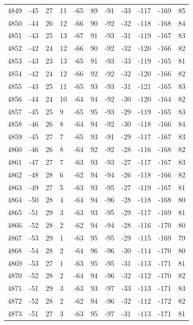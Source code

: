 \begin{table}[H]
\begin{tabular}{lllllllllll}
4849 & -45 & 27 & 11 & -65 & 89 & -91 & -33 & -117 & -169 & 85 \\
4850 & -44 & 26 & 12 & -66 & 90 & -92 & -32 & -118 & -168 & 84 \\
4851 & -43 & 25 & 13 & -67 & 91 & -93 & -31 & -119 & -167 & 83 \\
4852 & -42 & 24 & 12 & -66 & 90 & -92 & -32 & -120 & -166 & 82 \\
4853 & -43 & 23 & 13 & -65 & 91 & -93 & -33 & -119 & -165 & 81 \\
4854 & -42 & 24 & 12 & -66 & 92 & -92 & -32 & -120 & -166 & 82 \\
4855 & -43 & 25 & 11 & -65 & 93 & -93 & -31 & -121 & -165 & 83 \\
4856 & -44 & 24 & 10 & -64 & 94 & -92 & -30 & -120 & -164 & 82 \\
4857 & -45 & 25 & 9 & -65 & 95 & -93 & -29 & -119 & -165 & 83 \\
4858 & -46 & 26 & 8 & -64 & 94 & -92 & -30 & -118 & -166 & 84 \\
4859 & -45 & 27 & 7 & -65 & 93 & -91 & -29 & -117 & -167 & 83 \\
4860 & -46 & 26 & 8 & -64 & 92 & -92 & -28 & -116 & -168 & 82 \\
4861 & -47 & 27 & 7 & -63 & 93 & -93 & -27 & -117 & -167 & 83 \\
4862 & -48 & 28 & 6 & -62 & 94 & -94 & -26 & -118 & -166 & 82 \\
4863 & -49 & 27 & 5 & -63 & 93 & -95 & -27 & -119 & -167 & 81 \\
4864 & -50 & 28 & 4 & -64 & 94 & -96 & -28 & -118 & -168 & 80 \\
4865 & -51 & 29 & 3 & -63 & 93 & -95 & -29 & -117 & -169 & 81 \\
4866 & -52 & 28 & 2 & -62 & 94 & -94 & -28 & -116 & -170 & 80 \\
4867 & -53 & 29 & 1 & -63 & 95 & -95 & -29 & -115 & -169 & 79 \\
4868 & -54 & 28 & 2 & -64 & 96 & -96 & -30 & -114 & -170 & 80 \\
4869 & -53 & 27 & 1 & -63 & 95 & -95 & -31 & -113 & -171 & 81 \\
4870 & -52 & 28 & 2 & -64 & 94 & -96 & -32 & -112 & -170 & 82 \\
4871 & -51 & 29 & 3 & -63 & 93 & -97 & -33 & -113 & -171 & 83 \\
4872 & -52 & 28 & 2 & -62 & 94 & -96 & -32 & -112 & -172 & 82 \\
4873 & -51 & 27 & 3 & -63 & 95 & -97 & -31 & -113 & -171 & 81 \\

\end{tabular}
\end{table}
